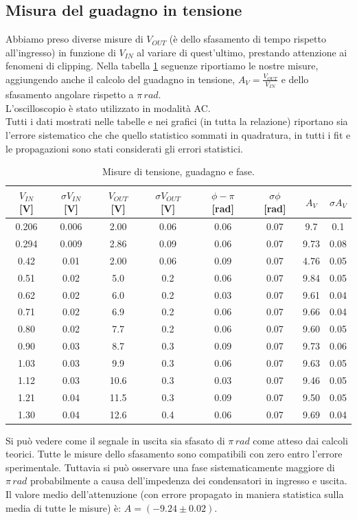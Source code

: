 \documentclass[10pt,a4paper]{article}
\begin{document}
\subsection{Misura del guadagno in tensione}
Abbiamo preso diverse misure di $V_{OUT}$ (è dello sfasamento di tempo rispetto all'ingresso) in funzione di $V_{IN}$ al variare di quest'ultimo, prestando attenzione ai fenomeni di clipping. Nella tabella \ref{ampiezza} seguenze riportiamo le nostre misure, aggiungendo anche il calcolo del guadagno in tensione, $A_V=\frac{V_{OUT}}{V_{IN}}$ e dello sfasamento angolare rispetto a $\pi \,rad$.\\
L'oscilloscopio è stato utilizzato in modalità AC.\\
Tutti i dati mostrati nelle tabelle e nei grafici (in tutta la relazione) riportano sia l'errore sistematico che che quello statistico sommati in quadratura, in tutti i fit e le propagazioni sono stati considerati gli errori statistici.

\begin{table}[!hbt]
\centering
\begin{tabular}{|c|c|c|c|c|c|c|c|}
\hline 
$V_{IN}$ [V] & $\sigma V_{IN}$ [V] & $V_{OUT}$ [V]& $\sigma V_{OUT}$ [V] & $\phi - \pi$ [rad] & $\sigma \phi$ [rad] & $A_V$ & $\sigma A_V$ \\ 
\hline
0.206 & 0.006 & 2.00 & 0.06 & 0.06 & 0.07 & 9.7 & 0.1\\
0.294 & 0.009 & 2.86 & 0.09 & 0.06 & 0.07 & 9.73 & 0.08\\
0.42 & 0.01 & 2.00 & 0.06 & 0.09 & 0.07 & 4.76 & 0.05\\
0.51 & 0.02 & 5.0 & 0.2 & 0.06 & 0.07 & 9.84 & 0.05\\
0.62 & 0.02 & 6.0 & 0.2 & 0.03 & 0.07 & 9.61 & 0.04\\
0.71 & 0.02 & 6.9 & 0.2 & 0.06 & 0.07 & 9.66 & 0.04\\
0.80 & 0.02 & 7.7 & 0.2 & 0.06 & 0.07 & 9.60 & 0.05\\
0.90 & 0.03 & 8.7 & 0.3 & 0.09 & 0.07 & 9.73 & 0.06\\
1.03 & 0.03 & 9.9 & 0.3 & 0.06 & 0.07 & 9.63 & 0.05\\
1.12 & 0.03 & 10.6 & 0.3 & 0.03 & 0.07 & 9.46 & 0.05\\
1.21 & 0.04 & 11.5 & 0.3 & 0.09 & 0.07 & 9.50 & 0.05\\
1.30 & 0.04 & 12.6 & 0.4 & 0.06 & 0.07 & 9.69 & 0.04\\
\hline
\end{tabular}
\caption{Misure di tensione, guadagno e fase.} \label{ampiezza}
\end{table}
Si può vedere come il segnale in uscita sia sfasato di $\pi \, rad$ come atteso dai calcoli teorici. Tutte le misure dello sfasamento sono compatibili con zero entro l'errore sperimentale. Tuttavia si può osservare una fase sistematicamente maggiore di $\pi \, rad$ probabilmente a causa dell'impedenza dei condensatori in ingresso e uscita. Il valore medio dell'attenuzione (con errore propagato in maniera statistica sulla media di tutte le misure) è: $A = (-9.24 \pm 0.02)$.
\end{document}
